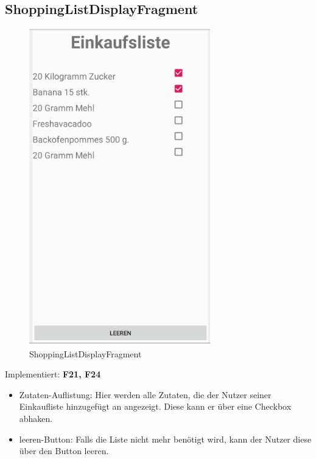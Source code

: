\subsection{ShoppingListDisplayFragment}
\begin{figure}[H]
	\centering
	\includegraphics[width=0.7\textwidth]{pics/shoppingListdisplayFragment.png}%
	\caption{ShoppingListDisplayFragment}%
	\label{view}%
\end{figure}
Implementiert: \textbf{F21, F24}
\begin{itemize}[nosep]
	\item Zutaten-Auflistung: Hier werden alle Zutaten, die der Nutzer seiner Einkaufliste hinzugefügt an angezeigt. Diese kann er über eine Checkbox abhaken. 
	\item leeren-Button: Falls die Liste nicht mehr benötigt wird, kann der Nutzer diese über den Button leeren.
\end{itemize}

